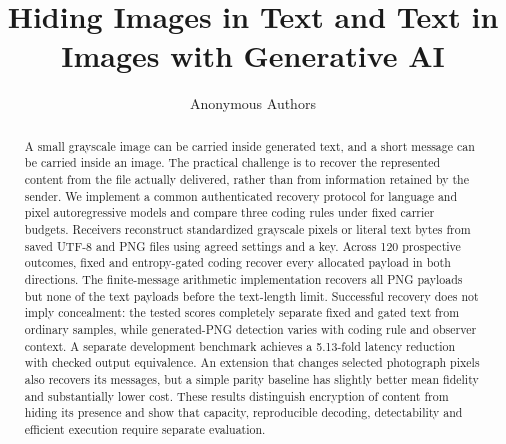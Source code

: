 \documentclass[orivec]{llncs}
\begin{document}
\title{Hiding Images in Text and Text in Images with Generative AI}
\author{Anonymous Authors}
\institute{}
\maketitle

\begin{abstract}
A small grayscale image can be carried inside generated text, and a short message can be carried inside an image. The practical challenge is to recover the represented content from the file actually delivered, rather than from information retained by the sender. We implement a common authenticated recovery protocol for language and pixel autoregressive models and compare three coding rules under fixed carrier budgets. Receivers reconstruct standardized grayscale pixels or literal text bytes from saved UTF-8 and PNG files using agreed settings and a key. Across 120 prospective outcomes, fixed and entropy-gated coding recover every allocated payload in both directions. The finite-message arithmetic implementation recovers all PNG payloads but none of the text payloads before the text-length limit. Successful recovery does not imply concealment: the tested scores completely separate fixed and gated text from ordinary samples, while generated-PNG detection varies with coding rule and observer context. A separate development benchmark achieves a 5.13-fold latency reduction with checked output equivalence. An extension that changes selected photograph pixels also recovers its messages, but a simple parity baseline has slightly better mean fidelity and substantially lower cost. These results distinguish encryption of content from hiding its presence and show that capacity, reproducible decoding, detectability and efficient execution require separate evaluation.
\end{abstract}
\end{document}
